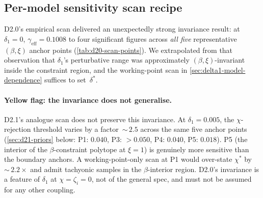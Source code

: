 \subsection{Per-model sensitivity scan recipe}
\label{sec:per-model-recipe}

D2.0's empirical scan delivered an unexpectedly strong invariance
result: at $\delta_1=0$, $\gamma_\mathrm{eff}=0.1008$ to four
significant figures across \emph{all five} representative
$(\beta,\xi)$ anchor points (\cref{tab:d20-scan-points}).  We
extrapolated from that observation that $\delta_1$'s perturbative
range was approximately $(\beta,\xi)$-invariant inside the
constraint region, and the working-point scan in
\cref{sec:delta1-model-dependence} suffices to set~$\delta^*$.

\paragraph{Yellow flag: the invariance does not generalise.}
D2.1's analogue scan does not preserve this invariance.  At
$\delta_1=0.005$, the $\chi$-rejection threshold varies by a
factor~${\sim}\,2.5$ across the same five anchor points
(\cref{sec:d21-priors} below: P1: $0.040$, P3: $>0.050$, P4:
$0.040$, P5: $0.018$).  P5 (the interior of the
$\beta$-constraint polytope at $\xi=1$) is genuinely more
sensitive than the boundary anchors.  A working-point-only scan at
P1 would over-state $\chi^*$ by~${\sim}\,2.2\times$ and admit
tachyonic samples in the $\beta$-interior region.  D2.0's
invariance is a feature of $\delta_1$ at $\chi=\zeta_i=0$, not of
the general spec, and must not be assumed for any other coupling.

